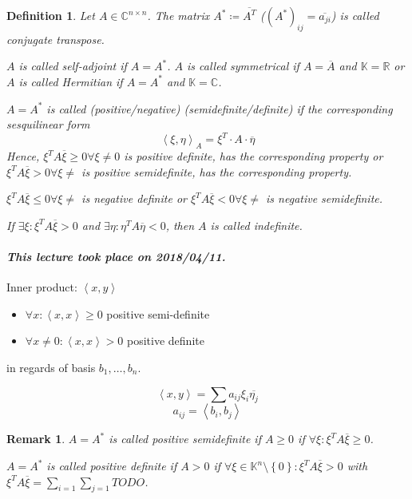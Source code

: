 \documentclass{article}
\newtheorem{definition}{Definition}  \numberwithin{definition}{section}
\newtheorem{remark}{Remark}  \numberwithin{remark}{section}
\newcommand{\set}[1]{\left\{#1\right\}}
\newcommand{\angel}[1]{\left\langle#1\right\rangle}
\newcommand{\dateref}[1]{\paragraph{\textit{This lecture took place on #1.}}}
\begin{document}
\begin{definition} %
  Let $A \in \mathbb C^{n \times n}$.
  The matrix $A^* \coloneqq \overline{A^T}$ ($(A^*)_{ij} = \overline{a_{ji}}$)
  is called \emph{conjugate transpose}.

  $A$ is called \emph{self-adjoint} if $A = A^*$.
  $A$ is called \emph{symmetrical} if $A = \overline{A}$ and $\mathbb K = \mathbb R$
  or $A$ is called \emph{Hermitian} if $A = A^*$ and $\mathbb K = \mathbb C$.

  $A = A^*$ is called (positive/negative) (semidefinite/definite) if the corresponding sesquilinear form
  \[ \angel{\xi, \eta}_A = \xi^T \cdot A \cdot \overline{\eta} \]
  Hence, $\xi^T A \overline{\xi} \geq 0 \forall \xi \neq 0$ is positive definite, has the corresponding property or
  $\xi^T A \overline{\xi} > 0 \forall \xi \neq$ is positive semidefinite, has the corresponding property.

  $\xi^T A \overline{\xi} \leq 0 \forall \xi \neq$ is negative definite or
  $\xi^T A \overline{\xi} < 0 \forall \xi \neq$ is negative semidefinite.

  If $\exists \xi: \xi^T A \overline{\xi} > 0$ and $\exists \eta: \eta^T A \overline{\eta} < 0$, then $A$ is called indefinite.
\end{definition}

\dateref{2018/04/11}

Inner product: $\angel{x,y}$
\begin{itemize}
  \item $\forall x: \angel{x,x} \geq 0$ positive semi-definite
  \item $\forall x \neq 0: \angel{x,x} > 0$ positive definite
\end{itemize}
in regards of basis $b_1, \dots, b_n$.

\[ \angel{x,y} = \sum a_{ij} \xi_i \overline{\eta_j} \]
\[ a_{ij} = \angel{b_i, b_j} \]

\begin{remark}
  $A = A^*$ is called \emph{positive semidefinite} if $A \geq 0$ if $\forall \xi: \xi^T A \overline{\xi} \geq 0$.

  $A = A^*$ is called \emph{positive definite} if $A > 0$ if $\forall \xi \in \mathbb K^n\setminus \set{0}: \xi^T A \overline{\xi} > 0$
  with $\xi^T A \overline{\xi} = \sum_{i=1} \sum_{j=1} TODO$.
\end{remark}
\end{document}
